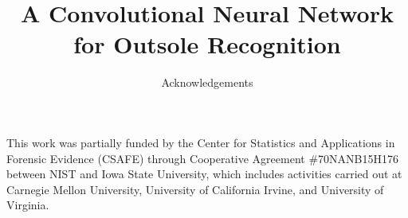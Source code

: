 \documentclass{article}
\author{Acknowledgements}
\title{A Convolutional Neural Network for Outsole Recognition}
\begin{document}
\maketitle



This work was partially funded by the Center for Statistics and Applications in Forensic Evidence (CSAFE) through Cooperative Agreement \#70NANB15H176 between NIST and Iowa State University, which includes activities carried out at Carnegie Mellon University, University of California Irvine, and University of Virginia.
\end{document}
